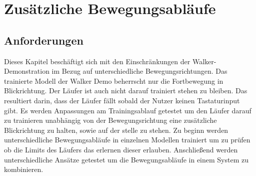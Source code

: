 \section{Zusätzliche Bewegungsabläufe}
\subsection{Anforderungen}
Dieses Kapitel beschäftigt sich mit den Einschränkungen der Walker-Demonstration im Bezug auf unterschiedliche Bewegungsrichtungen. Das trainierte Modell der Walker Demo beherrscht nur die Fortbewegung in Blickrichtung. Der Läufer ist auch nicht darauf trainiert stehen zu bleiben. Das resultiert darin, dass der Läufer fällt sobald der Nutzer keinen Tastaturinput gibt. Es werden Anpassungen am Trainingsablauf getestet um den Läufer darauf zu trainieren unabhängig von der Bewegungsrichtung eine zusätzliche Blickrichtung zu halten, sowie auf der stelle zu stehen. Zu beginn werden unterschiedliche Bewegungsabläufe in einzelnen Modellen trainiert um zu prüfen ob die Limits des Läufers das erlernen dieser erlauben. Anschließend werden unterschiedliche Ansätze getestet um die Bewegungsabläufe in einem System zu kombinieren.




